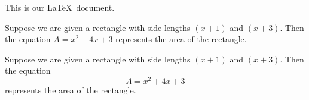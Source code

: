\documentclass[11pt]{article}
\begin{document}
This is our \LaTeX\ document.

Suppose we are given a rectangle with side lengths $(x+1)$ and $(x+3)$. Then the equation $A=x^2+4x+3$ represents the area of the rectangle.\

Suppose we are given a rectangle with side lengths $(x+1)$ and $(x+3)$. Then the equation \[A=x^2+4x+3\] represents the area of the rectangle.
\end{document}
